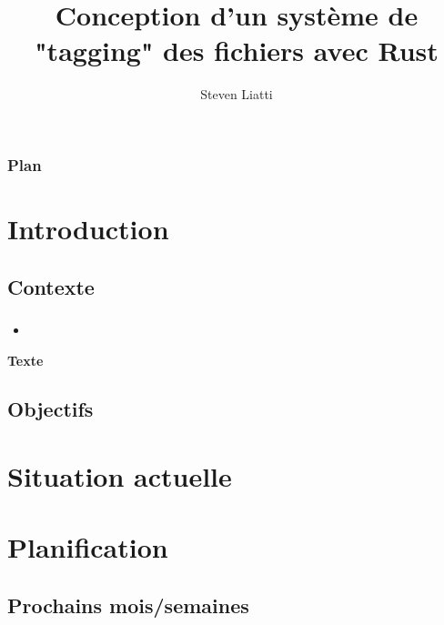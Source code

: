 \documentclass[10pt]{beamer}
\begin{document}

\title{Conception d’un système de "tagging" des fichiers avec Rust}
\author{Steven Liatti}

\begin{frame}
\titlepage
\end{frame}

\begin{frame}
    \frametitle{Plan}
	\setcounter{tocdepth}{3}
	\tableofcontents
\end{frame}

\section{Introduction}
\subsection{Contexte}
\begin{frame}
	\frametitle{\secname}
	\framesubtitle{\subsecname}
    \begin{itemize}
        \item 
    \end{itemize}
    \Large\textbf{Texte}
\end{frame}

\subsection{Objectifs}
\begin{frame}
	\frametitle{\secname}
	\framesubtitle{\subsecname}
    
\end{frame}

\section{Situation actuelle}
\begin{frame}
	\frametitle{\secname}

\end{frame}

\section{Planification}
\subsection{Prochains mois/semaines}
\begin{frame}
	\frametitle{\secname}
	\framesubtitle{\subsecname}

\end{frame}
\end{document}
